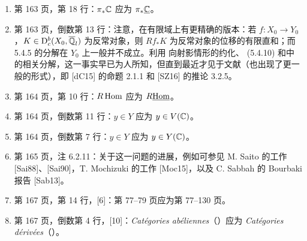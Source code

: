 \begin{enumerate}[label=\arabic*.,leftmargin=2.5em,itemsep=.65\baselineskip]
\item 第 163 页，第 18 行：$\pi_*\mathbb C$ 应为 $\pi_*\underline{\mathbb C}$。
\item 第 163 页，倒数第 13 行：注意，在有限域上有更精确的版本：若 $f:X_0\to Y_0$ ，$K\in\mathrm{D}_c^b(X_0,\overline{\mathbb Q}_l)$ 为反常对象，则 $Rf_*K$ 为反常对象的位移的有限直和；而 5.4.5 的分解在 $Y_0$ 上一般并不成立。利用
向射影情形的约化、 (5.4.10) 和中的相关分解，这一事实早已为人所知，但直到最近才见于文献（也出现了更一般的形式），即 [dC15] 的命题 2.1.1 和 [SZ16] 的推论 3.2.5。
\item 第 164 页，第 10 行：$R\operatorname{Hom}$ 应为 $R\underline{\operatorname{Hom}}$。
\item 第 164 页，倒数第 11 行：$y\in Y$ 应为 $y\in V(\mathbb C)$。
\item 第 164 页，倒数第 7 行：$y\in Y$ 应为 $y\in Y(\mathbb C)$。
\item 第 165 页，注 6.2.11：关于这一问题的进展，例如可参见 M. Saito 的工作 [Sai88]、[Sai90]，T. Mochizuki 的工作 [Moc15]，以及 C. Sabbah 的 Bourbaki 报告 [Sab13]。
\item 第 167 页，第 14 行，[6]：第 77--79 页应为第 77--130 页。
\item 第 167 页，倒数第 4 行，[10]：\emph{Catégories abéliennes}（）应为 \emph{Catégories dérivées}（）。
\end{enumerate}

